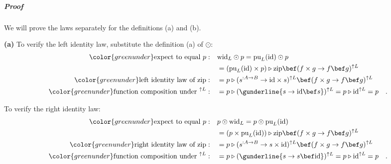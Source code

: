 \subparagraph{Proof}

We will prove the laws separately for the definitions (a) and (b).

\textbf{(a)} To verify the left identity law, substitute the definition
(a) of $\odot$:
\begin{align*}
{\color{greenunder}\text{expect to equal }p:}\quad & \text{wid}_{L}\odot p=\text{pu}_{L}(\text{id})\odot p\\
 & =(\text{pu}_{L}(\text{id})\times p)\triangleright\text{zip}\bef(f\times g\rightarrow f\bef g)^{\uparrow L}\\
{\color{greenunder}\text{left identity law of }\text{zip}:}\quad & =p\triangleright(s^{:A\rightarrow B}\rightarrow\text{id}\times s)^{\uparrow L}\bef(f\times g\rightarrow f\bef g)^{\uparrow L}\\
{\color{greenunder}\text{function composition under }^{\uparrow L}:}\quad & =p\triangleright(\gunderline{s\rightarrow\text{id}\bef s})^{\uparrow L}=p\triangleright\text{id}^{\uparrow L}=p\quad.
\end{align*}

To verify the right identity law:
\begin{align*}
{\color{greenunder}\text{expect to equal }p:}\quad & p\odot\text{wid}_{L}=p\odot\text{pu}_{L}(\text{id})\\
 & =(p\times\text{pu}_{L}(\text{id}))\triangleright\text{zip}\bef(f\times g\rightarrow f\bef g)^{\uparrow L}\\
{\color{greenunder}\text{right identity law of }\text{zip}:}\quad & =p\triangleright(s^{:A\rightarrow B}\rightarrow s\times\text{id})^{\uparrow L}\bef(f\times g\rightarrow f\bef g)^{\uparrow L}\\
{\color{greenunder}\text{function composition under }^{\uparrow L}:}\quad & =p\triangleright(\gunderline{s\rightarrow s\bef\text{id}})^{\uparrow L}=p\triangleright\text{id}^{\uparrow L}=p\quad.
\end{align*}

